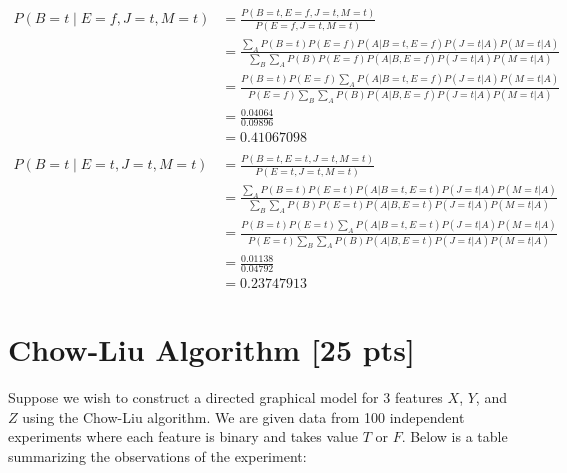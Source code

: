 \documentclass[a4paper]{article}
\theoremstyle{definition}
\newenvironment{soln}{
	\leavevmode\color{blue}\ignorespaces
}{}
\begin{document}
\begin{soln}
	\begin{align*}
		P(B=t \mid E=f,J=t,M=t) & = \frac{P(B=t, E=f, J=t, M=t)}{P(E=f, J=t, M=t)}                                                                      \\
		                        & = \frac{\sum_A P(B=t) P(E=f) P(A|B=t,E=f) P(J=t|A) P(M=t|A) }{\sum_B\sum_A P(B) P(E=f) P(A|B,E=f) P(J=t|A) P(M=t|A) } \\
		                        & = \frac{P(B=t) P(E=f) \sum_A P(A|B=t,E=f) P(J=t|A) P(M=t|A) }{P(E=f) \sum_B\sum_A P(B) P(A|B,E=f) P(J=t|A) P(M=t|A) } \\
		                        & = \frac{0.04064}{0.09896}                                                                                             \\
		                        & = 0.41067098 \\\\
		P(B=t \mid E=t,J=t,M=t) & = \frac{P(B=t, E=t, J=t, M=t)}{P(E=t, J=t, M=t)}                                                                      \\
		                        & = \frac{\sum_A P(B=t) P(E=t) P(A|B=t,E=t) P(J=t|A) P(M=t|A) }{\sum_B\sum_A P(B) P(E=t) P(A|B,E=t) P(J=t|A) P(M=t|A) } \\
		                        & = \frac{P(B=t) P(E=t) \sum_A P(A|B=t,E=t) P(J=t|A) P(M=t|A) }{P(E=t) \sum_B\sum_A P(B) P(A|B,E=t) P(J=t|A) P(M=t|A) } \\
		                        & = \frac{0.01138}{0.04792}                                                                                             \\
		                        & = 0.23747913
	\end{align*}
\end{soln}

\pagebreak


\section{Chow-Liu Algorithm [25 pts]}
Suppose we wish to construct a directed graphical model for 3 features $X$, $Y$, and $Z$ using the Chow-Liu algorithm. We are given data from 100 independent experiments where each feature is binary and takes value $T$ or $F$. Below is a table summarizing the observations of the experiment:
\end{document}
